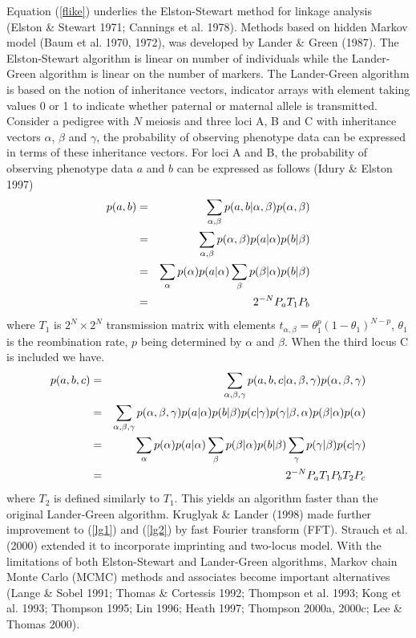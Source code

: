 Equation (\ref{flike}) underlies the Elston-Stewart method for linkage analysis
(Elston \& Stewart 1971; Cannings et al.  1978).  Methods based on hidden
Markov model (Baum et al.  1970, 1972), was developed by Lander \& Green
(1987).  The Elston-Stewart algorithm is linear on number of individuals while
the Lander-Green algorithm is linear on the number of markers.  The
Lander-Green algorithm is based on the notion of inheritance vectors, indicator
arrays with element taking values 0 or 1 to indicate whether paternal or
maternal allele is transmitted.  Consider a pedigree with $N$ meiosis and three
loci A, B and C with inheritance vectors $\alpha$, $\beta$ and $\gamma$, the
probability of observing phenotype data can be expressed in terms of these
inheritance vectors.  For loci A and B, the probability of observing phenotype
data $a$ and $b$ can be expressed as follows (Idury \& Elston 1997)
\begin{eqnarray}
p(a,b)&=&\sum_{\alpha,\beta}p(a,b|\alpha,\beta)p(\alpha,\beta) \cr
      &=&\sum_{\alpha,\beta}p(\alpha,\beta)p(a|\alpha)p(b|\beta) \cr
&=&\sum_{\alpha}p(\alpha)p(a|\alpha)\sum_{\beta}p(\beta|\alpha)p(b|\beta) \cr
      &=&2^{-N}P_aT_1P_b \label{lg1}
\end{eqnarray}
where $T_1$ is $2^N\times 2^N$ transmission matrix with elements
$t_{\alpha,\beta}=\theta_1^p(1-\theta_1)^{N-p}$, $\theta_1$ is the reombination
rate, $p$ being determined by $\alpha$ and $\beta$.  When the third locus C is
included we have.
\begin{eqnarray}
p(a,b,c)&=&\sum_{\alpha,\beta,\gamma}
p(a,b,c|\alpha,\beta,\gamma)p(\alpha,\beta,\gamma) \cr
&=&\sum_{\alpha,\beta,\gamma}p(\alpha,\beta,\gamma)
p(a|\alpha)p(b|\beta)p(c|\gamma) p(\gamma|\beta,\alpha)p(\beta|\alpha)p(\alpha) \cr
&=&\sum_{\alpha}p(\alpha)p(a|\alpha)\sum_{\beta}p(\beta|\alpha)p(b|\beta)
\sum_{\gamma}p(\gamma|\beta)p(c|\gamma) \cr &=&2^{-N}P_aT_1P_bT_2P_c
\label{lg2} \end{eqnarray}
where $T_2$ is defined similarly to $T_1$.  This yields an algorithm faster
than the original Lander-Green algorithm.  Kruglyak \& Lander (1998) made
further improvement to (\ref{lg1}) and (\ref{lg2}) by fast Fourier transform
(FFT).  Strauch et al.  (2000) extended it to incorporate imprinting and
two-locus model.  With the limitations of both Elston-Stewart and Lander-Green
algorithms, Markov chain Monte Carlo (MCMC) methods and associates become
important alternatives (Lange \& Sobel 1991; Thomas \& Cortessis 1992; Thompson
et al.  1993; Kong et al.  1993; Thompson 1995; Lin 1996; Heath 1997; Thompson
2000a, 2000c; Lee \& Thomas 2000).

